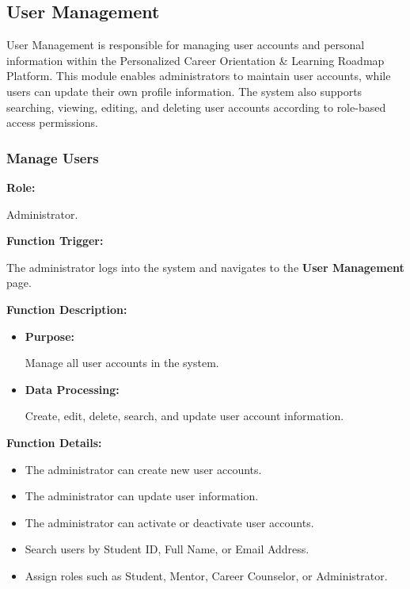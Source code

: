 \subsection{User Management}

User Management is responsible for managing user accounts and personal information within the Personalized Career Orientation \& Learning Roadmap Platform. This module enables administrators to maintain user accounts, while users can update their own profile information. The system also supports searching, viewing, editing, and deleting user accounts according to role-based access permissions.
\subsubsection{Manage Users}

\textbf{Role:}

Administrator.

\vspace{0.3cm}

\textbf{Function Trigger:}

The administrator logs into the system and navigates to the \textbf{User Management} page.

\vspace{0.3cm}

\textbf{Function Description:}

\begin{itemize}
    \item \textbf{Purpose:}

    Manage all user accounts in the system.

    \item \textbf{Data Processing:}

    Create, edit, delete, search, and update user account information.
\end{itemize}

\vspace{0.3cm}

\textbf{Function Details:}

\begin{itemize}
    \item The administrator can create new user accounts.

    \item The administrator can update user information.

    \item The administrator can activate or deactivate user accounts.

    \item Search users by Student ID, Full Name, or Email Address.

    \item Assign roles such as Student, Mentor, Career Counselor, or Administrator.
\end{itemize}



